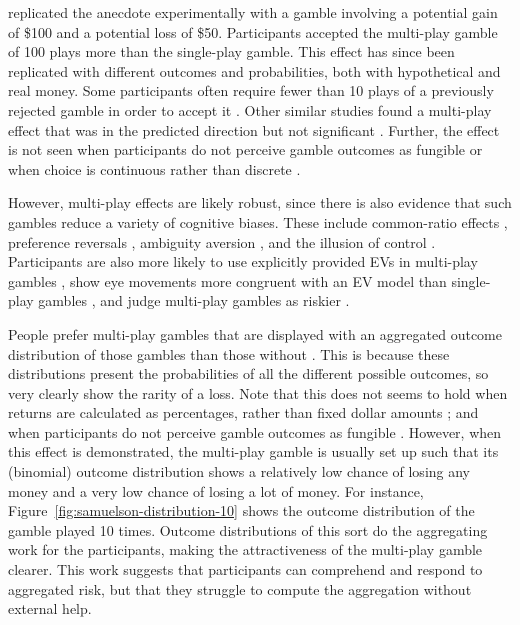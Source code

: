 \documentclass[a4paper, nobind, dvipsnames]{templates/ociamthesis}
\theoremstyle{definition}
\theoremstyle{definition}
\theoremstyle{definition}
\theoremstyle{definition}
\theoremstyle{remark}
\begin{document}
\textcite{wedell1994} replicated the \textcite{samuelson1963} anecdote experimentally with a gamble
involving a potential gain of \$100 and a potential loss of \$50. Participants
accepted the multi-play gamble of 100 plays more than the single-play gamble.
This effect has since been replicated with different outcomes and probabilities,
both with hypothetical and real money. Some participants often require fewer
than 10 plays of a previously rejected gamble in order to accept it \autocite{dekay2005,keren1991,montgomery1982,redelmeier1992}. Other similar studies found a
multi-play effect that was in the predicted direction but not significant
\autocite{barron2003,benartzi1999,klos2005,langer2001}. Further, the effect is not
seen when participants do not perceive gamble outcomes as fungible \autocite{dekay2006,dekay2005,dekay2011} or when choice is continuous rather than discrete
\autocite{bristow2011}.

However, multi-play effects are likely robust, since there is also evidence that
such gambles reduce a variety of cognitive biases. These include common-ratio
effects \autocite{keren1987,keren1991,dekay2006}, preference reversals
\autocite{wedell1990}, ambiguity aversion \autocite{liu2009}, and the illusion of control
\autocite{koehler1994}. Participants are also more likely to use explicitly provided EVs
in multi-play gambles \autocite{li2003}, show eye movements more congruent with an EV
model than single-play gambles \autocite{su2013}, and judge multi-play gambles as
riskier \autocite{joag1990}.

People prefer multi-play gambles that are displayed with an aggregated outcome
distribution of those gambles than those without \autocite{benartzi1999,redelmeier1992,klos2013,webb2017,coombs1971,venkatraman2006,dekay2005,langer2001,keren1991}. This is because these distributions
present the probabilities of all the different possible outcomes, so very
clearly show the rarity of a loss. Note that this does not seems to hold when
returns are calculated as percentages, rather than fixed dollar amounts
\autocite{stutzer2013}; and when participants do not perceive gamble outcomes as
fungible \autocite{dekay2005}. However, when this effect is demonstrated, the multi-play
gamble is usually set up such that its (binomial) outcome distribution shows a
relatively low chance of losing any money and a very low chance of losing a lot
of money. For instance, Figure~\ref{fig:samuelson-distribution-10} shows the
outcome distribution of the \textcite{samuelson1963} gamble played 10 times. Outcome
distributions of this sort do the aggregating work for the participants, making
the attractiveness of the multi-play gamble clearer. This work suggests that
participants can comprehend and respond to aggregated risk, but that they
struggle to compute the aggregation without external help.
\end{document}
